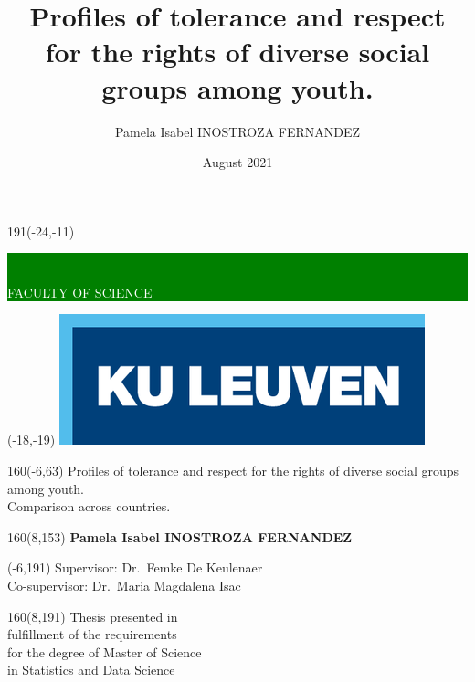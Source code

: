 \documentclass[12pt,a4paper,oneside]{reedthesis}
\title{Profiles of tolerance and respect for the rights of diverse social groups among youth.}
\author{Pamela Isabel INOSTROZA FERNANDEZ}
\date{August 2021}
\institute{Leuven Statistics Research Centre}
\begin{document}
\thispagestyle{empty}
\newcommand{\form}[1]{\scalebox{1.087}{\boldmath{#1}}}
\sffamily
%
\begin{textblock}{191}(-24,-11)
\colorbox{green}{\hspace{139mm}\ \parbox[c][18truemm]{52mm}{\textcolor{white}{FACULTY OF SCIENCE}}}
\end{textblock}
%
\begin{textblock}{70}(-18,-19)
\textblockcolour{}
\includegraphics*[height=19.8truemm]{LogoKULeuven}
\end{textblock}
%
\begin{textblock}{160}(-6,63)
\textblockcolour{}
\vspace{-\parskip}
\flushleft
\fontsize{40}{42}\selectfont \textcolor{bluetitle}{Profiles of tolerance and respect for the rights of diverse social groups among youth.}\\[1.5mm]
\fontsize{20}{22}\selectfont Comparison across countries.
\end{textblock}
%
\begin{textblock}{160}(8,153)
\textblockcolour{}
\vspace{-\parskip}
\flushright
\fontsize{14}{16}\selectfont \textbf{Pamela Isabel INOSTROZA FERNANDEZ}
\end{textblock}
%
\begin{textblock}{70}(-6,191)
\textblockcolour{}
\vspace{-\parskip}
\flushleft
Supervisor: Dr.~Femke De Keulenaer\\[-2pt]
Co-supervisor: Dr.~Maria Magdalena Isac\\[-2pt]
\end{textblock}
%
\begin{textblock}{160}(8,191)
\textblockcolour{}
\vspace{-\parskip}
\flushright
Thesis presented in\\[4.5pt]
fulfillment of the requirements\\[4.5pt]
for the degree of Master of Science\\[4.5pt]
in Statistics and Data Science\\
\end{textblock}
\end{document}
